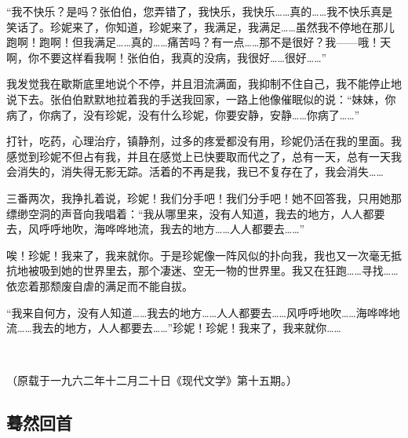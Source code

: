 \par “我不快乐？是吗？张伯伯，您弄错了，我快乐，我快乐……真的……我不快乐真是笑话了。珍妮来了，你知道，珍妮来了，我满足，我满足……虽然我不停地在那儿跑啊！跑啊！但我满足……真的……痛苦吗？有一点……那不是很好？我——哦！天啊，你不要这样看我啊！张伯伯，我真的没病，我很好……很好……”
\par 我发觉我在歇斯底里地说个不停，并且泪流满面，我抑制不住自己，我不能停止地说下去。张伯伯默默地拉着我的手送我回家，一路上他像催眠似的说：“妹妹，你病了，你病了，没有珍妮，没有什么珍妮，你要安静，安静……你病了……”
\par 打针，吃药，心理治疗，镇静剂，过多的疼爱都没有用，珍妮仍活在我的里面。我感觉到珍妮不但占有我，并且在感觉上已快要取而代之了，总有一天，总有一天我会消失的，消失得无影无踪。活着的不再是我，我已不复存在了，我会消失……
\par 三番两次，我挣扎着说，珍妮！我们分手吧！我们分手吧！她不回答我，只用她那缥缈空洞的声音向我唱着：“我从哪里来，没有人知道，我去的地方，人人都要去，风呼呼地吹，海哗哗地流，我去的地方……人人都要去……”
\par 唉！珍妮！我来了，我来就你。于是珍妮像一阵风似的扑向我，我也又一次毫无抵抗地被吸到她的世界里去，那个凄迷、空无一物的世界里。我又在狂跑……寻找……依恋着那颓废自虐的满足而不能自拔。
\par “我来自何方，没有人知道……我去的地方……人人都要去……风呼呼地吹……海哗哗地流……我去的地方，人人都要去……”珍妮！珍妮！我来了，我来就你……
\par  
\par （原载于一九六二年十二月二十日《现代文学》第十五期。）




\subsection{蓦然回首}


